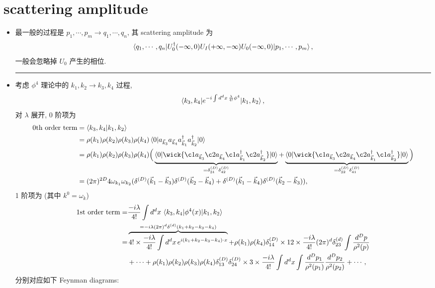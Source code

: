 \section{scattering amplitude}
\begin{itemize}
	\item 最一般的过程是 $p_1, \cdots, p_m \rightarrow q_1, \cdots, q_n$, 其 scattering amplitude 为
	\begin{equation}
		\braket{q_1, \cdots, q_n | U_0^\dag(- \infty, 0) U_I(+ \infty, - \infty) U_0(- \infty, 0) | p_1, \cdots, p_m},
	\end{equation}
	一般会忽略掉 $U_0$ 产生的相位.
	
	\noindent\rule[0.5ex]{\linewidth}{0.5pt} %
	
	\item 考虑 $\phi^4$ 理论中的 $k_1, k_2 \rightarrow k_3, k_4$ 过程,
	\begin{equation}
		\braket{k_3, k_4 | e^{- i \int d^d x \, \frac{\lambda}{4!} \phi^4} | k_1, k_2},
	\end{equation}
	对 $\lambda$ 展开, 0 阶项为
	\begin{align}
		\text{0th order term} &= \braket{k_3, k_4 | k_1, k_2} \notag \\
		&= \rho(k_1) \rho(k_2) \rho(k_3) \rho(k_4) \braket{0 | a_{\vec{k}_3} a_{\vec{k}_4} a^\dag_{\vec{k}_1} a^\dag_{\vec{k}_2} | 0} \notag \\
		&= \rho(k_1) \rho(k_2) \rho(k_3) \rho(k_4) \Big( \underbrace{\braket{0 | \wick{
			\c1 a_{\vec{k}_3} \c2 a_{\vec{k}_4} \c1 a^\dag_{\vec{k}_1} \c2 a^\dag_{\vec{k}_2}
		} | 0}}_{= \delta^{(D)}_{3 1} \delta^{(D)}_{4 2}} + \underbrace{\braket{0 | \wick{
			\c1 a_{\vec{k}_3} \c2 a_{\vec{k}_4} \c2 a^\dag_{\vec{k}_1} \c1 a^\dag_{\vec{k}_2}
		} | 0}}_{= \delta^{(D)}_{3 2} \delta^{(D)}_{4 1}} \Big) \notag \\
		&= (2 \pi)^{2 D} 4 \omega_{k_1} \omega_{k_2} (\delta^{(D)}(\vec{k}_1 - \vec{k}_3) \delta^{(D)}(\vec{k}_2 - \vec{k}_4) + \delta^{(D)}(\vec{k}_1 - \vec{k}_4) \delta^{(D)}(\vec{k}_2 - \vec{k}_3)),
	\end{align}
	1 阶项为 (其中 $k^0 = \omega_k$)
	\begin{align}
		\text{1st order term} =& \frac{- i \lambda}{4!} \int d^d x \, \braket{k_3, k_4 | \phi^4(x) | k_1, k_2} \notag \\
		=& \overbrace{4! \times \frac{- i \lambda}{4!} \int d^d x \, e^{i (k_1 + k_2 - k_3 - k_4) \cdot x}}^{= - i \lambda (2 \pi)^d \delta^{(d)}(k_1 + k_2 - k_3 - k_4)} + \rho(k_1) \rho(k_4) \delta^{(D)}_{1 4} \times 12 \times \frac{- i \lambda}{4!} (2 \pi)^d \delta^{(d)}_{2 3} \int \frac{d^D p}{\rho^2(p)} \notag \\
		& + \cdots + \rho(k_1) \rho(k_2) \rho(k_3) \rho(k_4) \delta^{(D)}_{1 3} \delta^{(D)}_{2 4} \times 3 \times \frac{- i \lambda}{4!} \int d^d x \int \frac{d^D p_1}{\rho^2(p_1)} \frac{d^D p_2}{\rho^2(p_2)} + \cdots,
	\end{align}
	分别对应如下 Feynman diagrams:
	

\end{itemize}
